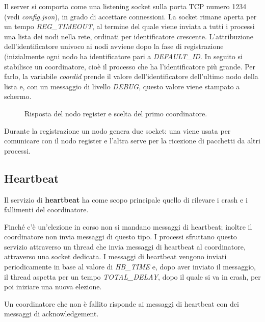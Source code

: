 \documentclass[conference]{IEEEtran}
\begin{document}
Il server si comporta come una listening socket sulla porta TCP numero 1234 (vedi \textit{config.json}), in grado di accettare connessioni.
La socket rimane aperta per un tempo \textit{REG\_TIMEOUT}, al termine del quale viene inviata a tutti i processi una lista dei nodi nella rete, ordinati per identificatore crescente.
L'attribuzione dell'identificatore univoco ai nodi avviene dopo la fase di registrazione (inizialmente ogni nodo ha identificatore pari a \textit{DEFAULT\_ID}.
In seguito si stabilisce un coordinatore, cioè il processo che ha l'identificatore più grande. Per farlo, la variabile \textit{coordid} prende il valore dell'identificatore dell'ultimo nodo della lista e, con un messaggio di livello \textit{DEBUG}, questo valore viene stampato a schermo.

\begin{figure}[htbp]
  \centering
  
  \caption{Risposta del nodo register e scelta del primo coordinatore.}
\end{figure}

Durante la registrazione un nodo genera due socket: una viene usata per comunicare con il nodo register e l'altra serve per la ricezione di pacchetti da altri processi.


\subsection{Heartbeat}\label{heartbeat}

Il servizio di \textbf{heartbeat} ha come scopo principale quello di rilevare i crash e i fallimenti del coordinatore.

Finché c'è un'elezione in corso non si mandano messaggi di heartbeat; inoltre il coordinatore non invia messaggi di questo tipo.
I processi sfruttano questo servizio attraverso un thread che invia messaggi di heartbeat al coordinatore, attraverso una socket dedicata.
I messaggi di heartbeat vengono inviati periodicamente in base al valore di \textit{HB\_TIME} e, dopo aver inviato il messaggio, il thread aspetta per un tempo \textit{TOTAL\_DELAY}, dopo il quale si va in crash, per poi iniziare una nuova elezione.

Un coordinatore che non è fallito risponde ai messaggi di heartbeat con dei messaggi di acknowledgement.
\end{document}
